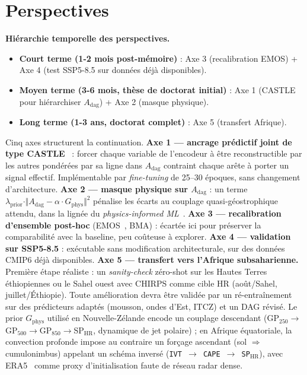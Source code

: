 \documentclass[14pt,a4paper,openany]{extreport}
\theoremstyle{definition}
\newcommand{\Adag}{\ensuremath{A_{\mathrm{dag}}}}
\begin{document}
\section*{Perspectives}

\textbf{Hiérarchie temporelle des perspectives.}
\begin{itemize}
\item \textbf{Court terme (1-2 mois post-mémoire)} : Axe 3 (recalibration EMOS) + Axe 4 (test SSP5-8.5 sur données déjà disponibles).
\item \textbf{Moyen terme (3-6 mois, thèse de doctorat initial)} : Axe 1 (CASTLE pour hiérarchiser $A_{\mathrm{dag}}$) + Axe 2 (masque physique).
\item \textbf{Long terme (1-3 ans, doctorat complet)} : Axe 5 (transfert Afrique).
\end{itemize}

Cinq axes structurent la continuation. \textbf{Axe 1 --- ancrage prédictif joint de type CASTLE}~\cite{kyono_castle_2020} : forcer chaque variable de l'encodeur à être reconstructible par les autres pondérées par sa ligne dans $\Adag$ contraint chaque arête à porter un signal effectif. Implémentable par \emph{fine-tuning} de 25--30 époques, sans changement d'architecture. \textbf{Axe 2 --- masque physique sur $\Adag$} : un terme $\lambda_{\mathrm{prior}} \cdot \Vert \Adag - \alpha \cdot G_{\mathrm{phys}} \Vert^2$ pénalise les écarts au couplage quasi-géostrophique attendu, dans la lignée du \emph{physics-informed ML}~\cite{karniadakis_pinn_2021}. \textbf{Axe 3 --- recalibration d'ensemble post-hoc} (EMOS~\cite{gneiting_emos_2005}, BMA) : écartée ici pour préserver la comparabilité avec la baseline, peu coûteuse à explorer. \textbf{Axe 4 --- validation sur SSP5-8.5} : exécutable sans modification architecturale, sur des données CMIP6 déjà disponibles. \textbf{Axe 5 --- transfert vers l'Afrique subsaharienne.} Première étape réaliste : un \emph{sanity-check} zéro-shot sur les Hautes Terres éthiopiennes ou le Sahel ouest avec CHIRPS comme cible HR (août/Sahel, juillet/Éthiopie). Toute amélioration devra être validée par un ré-entraînement sur des prédicteurs adaptés (mousson, ondes d'Est, ITCZ) et un DAG révisé. Le prior $G_{\mathrm{phys}}$ utilisé en Nouvelle-Zélande encode un couplage descendant (GP$_{250}\!\to\!$GP$_{500}\!\to\!$GP$_{850}\!\to\!$SP$_{\mathrm{HR}}$, dynamique de jet polaire) ; en Afrique équatoriale, la convection profonde impose au contraire un forçage ascendant (sol $\Rightarrow$ cumulonimbus) appelant un schéma inversé (\texttt{IVT\,$\to$\,CAPE\,$\to$\,SP$_{\mathrm{HR}}$}), avec ERA5~\cite{hersbach_era5_2020} comme proxy d'initialisation faute de réseau radar dense.
\end{document}
